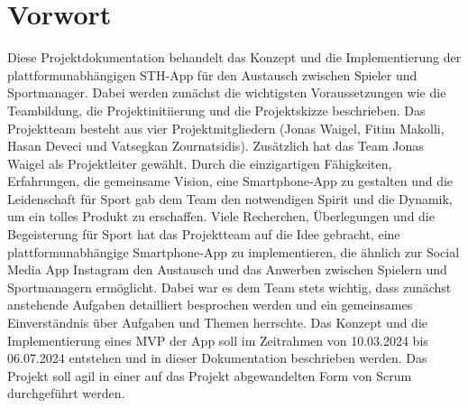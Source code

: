 \chapter{Vorwort}
Diese Projektdokumentation behandelt das Konzept und die Implementierung der plattformunabhängigen STH-App für den Austausch zwischen Spieler und Sportmanager.
Dabei werden zunächst die wichtigsten Voraussetzungen wie die Teambildung, die Projektinitiierung und die Projektskizze beschrieben.
Das Projektteam besteht aus vier Projektmitgliedern (Jonas Waigel, Fitim Makolli, Hasan Deveci und Vatsegkan Zournatsidis). 
Zusätzlich hat das Team Jonas Waigel als Projektleiter gewählt.
Durch die einzigartigen Fähigkeiten, Erfahrungen, die gemeinsame Vision, eine Smartphone-App zu gestalten und die Leidenschaft für Sport gab dem Team den notwendigen Spirit und die Dynamik, um ein tolles Produkt zu erschaffen.
\newline
Viele Recherchen, Überlegungen und die Begeisterung für Sport hat das Projektteam auf die Idee gebracht, eine plattformunabhängige Smartphone-App zu implementieren, die ähnlich zur Social Media App Instagram den Austausch und das Anwerben zwischen Spielern und Sportmanagern ermöglicht.
\newline
Dabei war es dem Team stets wichtig, dass zunächst anstehende Aufgaben detailliert besprochen werden und ein gemeinsames Einverständnis über Aufgaben und Themen herrschte.
Das Konzept und die Implementierung eines MVP der App soll im Zeitrahmen von 10.03.2024 bis 06.07.2024 entstehen und in dieser Dokumentation beschrieben werden.
Das Projekt soll agil in einer auf das Projekt abgewandelten Form von Scrum durchgeführt werden.


